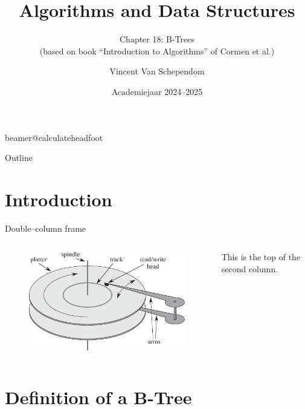 \documentclass[11pt,t]{beamer}
\title[Footer]{Algorithms and Data Structures} %
\subtitle{Chapter 18: B-Trees\\(based on book “Introduction to Algorithms” of Cormen et al.)}
\author{Vincent Van Schependom}
\institute{KU Leuven Campus Kulak Kortrijk}
\date{Academiejaar 2024--2025}
\begin{document}
	\csname beamer@calculateheadfoot\endcsname %


	\begin{frame}
		\titlepage
	\end{frame}


	\begin{frame}{Outline}
		\hfill	{\large \parbox{.961\textwidth}{\tableofcontents[hideothersubsections]}}
	\end{frame}



	\section{Introduction}

	\begin{frame}{Double--column frame}
		\begin{columns}
			\begin{column}{.5\textwidth}
				\centering
				\begin{figure}
					\includegraphics[width=\columnwidth]{images/disk}
				\end{figure}
			\end{column}
			\begin{column}{.5\textwidth}
				This is the top of the second column.
			\end{column}
		\end{columns}
	\end{frame}


	\section{Definition of a B-Tree}
\end{document}
